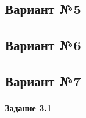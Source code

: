 \documentclass[a4paper, 12pt]{article}
\begin{document}
\pagebreak
\subsection{Вариант №5}

\pagebreak
\subsection{Вариант №6}

\pagebreak
\subsection{Вариант №7}
\paragraph{Задание 3.1}
\end{document}
